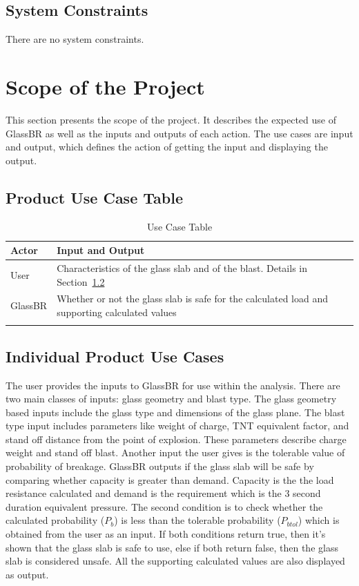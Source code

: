 \documentclass[12pt]{article}
\begin{document}
\subsection{System Constraints}
\label{Sec:SysConstraints}
There are no system constraints.
\section{Scope of the Project}
\label{Sec:ProjScope}
This section presents the scope of the project. It describes the expected use of GlassBR as well as the inputs and outputs of each action. The use cases are input and output, which defines the action of getting the input and displaying the output.
\subsection{Product Use Case Table}
\label{Sec:UseCaseTable}
\begin{longtabu}{l X[l]}
\toprule
Actor & Input and Output
\\
\midrule
User & Characteristics of the glass slab and of the blast. Details in Section~\ref{Sec:IndividualProdUC}
\\
GlassBR & Whether or not the glass slab is safe for the calculated load and supporting calculated values
\\
\bottomrule
\caption{Use Case Table}
\label{Table:useCaseTable}
\end{longtabu}
\subsection{Individual Product Use Cases}
\label{Sec:IndividualProdUC}
The user provides the inputs to GlassBR for use within the analysis. There are two main classes of inputs: glass geometry and blast type. The glass geometry based inputs include the glass type and dimensions of the glass plane. The blast type input includes parameters like weight of charge, TNT equivalent factor, and stand off distance from the point of explosion. These parameters describe charge weight and stand off blast. Another input the user gives is the tolerable value of probability of breakage. GlassBR outputs if the glass slab will be safe by comparing whether capacity is greater than demand. Capacity is the the load resistance calculated and demand is the requirement which is the 3 second duration equivalent pressure. The second condition is to check whether the calculated probability (${P_{b}}$) is less than the tolerable probability (${P_{btol}}$) which is obtained from the user as an input. If both conditions return true, then it's shown that the glass slab is safe to use, else if both return false, then the glass slab is considered unsafe. All the supporting calculated values are also displayed as output.
\end{document}
